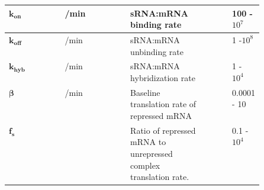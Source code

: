 \documentclass[10pt,journal]{./IEEE_latex_class/IEEEtran}
\begin{document}
\begin{table}[H]
\begin{tabular}{| l | l | p{0.3\linewidth} | p{0.1\linewidth} | p{0.1\linewidth} |}
\hline $\boldsymbol{k_{on}}$ &   /min & sRNA:mRNA binding rate & & 100 - $10^7$\\
\hline $\boldsymbol{k_{off}}$ &  /min & sRNA:mRNA unbinding rate & & 1 -$10^8$\\
\hline $\boldsymbol{k_{hyb}}$ &  /min & sRNA:mRNA hybridization rate & & 1 - $10^4$ \\
\hline $\boldsymbol{\beta}$ &   /min & Baseline translation rate of repressed mRNA & & 0.0001 - 10\\
\hline $\boldsymbol{f_{s}}$ & & Ratio of repressed mRNA to unrepressed complex translation rate. & & 0.1 - $10^4$\\
\hline
\end{tabular}
\end{table}
\end{document}
